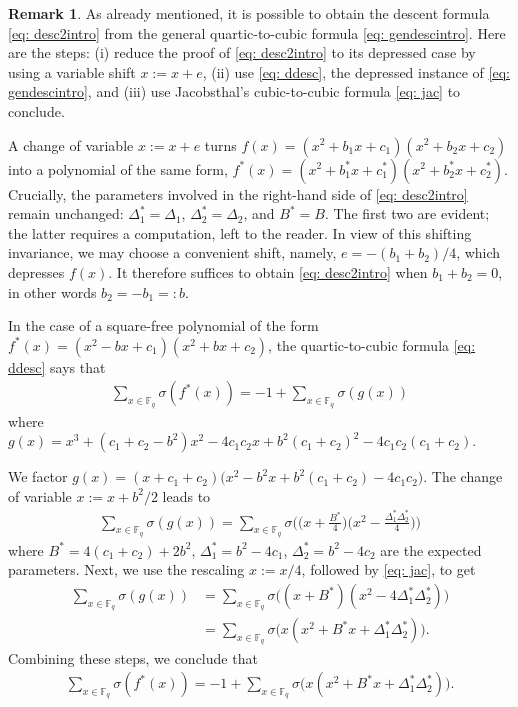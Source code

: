 \documentclass[11pt]{amsart}
\newcommand{\F}{\mathbb{F}}
\newcommand{\Fq}{\F_{\!q}}
\theoremstyle{definition}
\newtheorem{rem}{Remark}[section]
\begin{document}
\begin{rem}\label{rem}
As already mentioned, it is possible to obtain the descent formula \eqref{eq: desc2intro} from the general quartic-to-cubic formula \eqref{eq: gendescintro}. Here are the steps: (i) reduce the proof of \eqref{eq: desc2intro} to its depressed case by using a variable shift $x:=x+e$, (ii) use \eqref{eq: ddesc}, the depressed instance of \eqref{eq: gendescintro}, and (iii) use Jacobsthal's cubic-to-cubic formula \eqref{eq: jac} to conclude.

A change of variable $x:=x+e$ turns $f(x)=(x^2+b_1x+c_1)(x^2+b_2x+c_2)$ into a polynomial of the same form, $f^*(x)=(x^2+b^*_1x+c^*_1)(x^2+b^*_2x+c^*_2)$. Crucially, the parameters involved in the right-hand side of \eqref{eq: desc2intro} remain unchanged: $\Delta^*_1=\Delta_1$, $\Delta^*_2=\Delta_2$, and $B^*=B$. The first two are evident; the latter requires a computation, left to the reader. In view of this shifting invariance, we may choose a convenient shift, namely, $e=-(b_1+b_2)/4$, which depresses $f(x)$. It therefore suffices to obtain \eqref{eq: desc2intro} when $b_1+b_2=0$, in other words $b_2=-b_1=:b$.

In the case of a square-free polynomial of the form $f^*(x)=(x^2-bx+c_1)(x^2+bx+c_2)$, the quartic-to-cubic formula \eqref{eq: ddesc} says that
\begin{align*}
\sum_{x\in \Fq} \sigma(f^*(x))=-1+\sum_{x\in \Fq} \sigma(g(x))
\end{align*}
where $g(x)=x^3+(c_1+c_2-b^2)x^2-4c_1c_2x+b^2(c_1+c_2)^2-4c_1c_2(c_1+c_2)$.

We factor $g(x)=(x+c_1+c_2)\big(x^2-b^2x+b^2(c_1+c_2)-4c_1c_2\big)$. The change of variable $x:=x+b^2/2$ leads to
\begin{align*}
\sum_{x\in \Fq} \sigma(g(x))=\sum_{x\in \Fq} \sigma\bigg(\Big(x+\frac{B^*}{4}\Big)\Big(x^2-\frac{\Delta_1^*\Delta_2^*}{4}\Big)\bigg)
\end{align*}
where $B^*=4(c_1+c_2)+2b^2$, $\Delta_1^*=b^2-4c_1$, $\Delta_2^*=b^2-4c_2$ are the expected parameters. Next, we use the rescaling $x:=x/4$, followed by \eqref{eq: jac}, to get
\begin{align*}
\sum_{x\in \Fq} \sigma(g(x))&=\sum_{x\in \Fq} \sigma\big((x+B^*)(x^2-4\Delta_1^*\Delta_2^*)\big)\\
&=\sum_{x\in \Fq} \sigma\big(x(x^2+B^*x+\Delta_1^*\Delta_2^*)\big).
\end{align*}
Combining these steps, we conclude that
\begin{align*}
\sum_{x\in \Fq} \sigma(f^*(x))=-1+\sum_{x\in \Fq} \sigma\big(x(x^2+B^*x+\Delta_1^*\Delta_2^*)\big).
\end{align*}
\end{rem}
\end{document}
